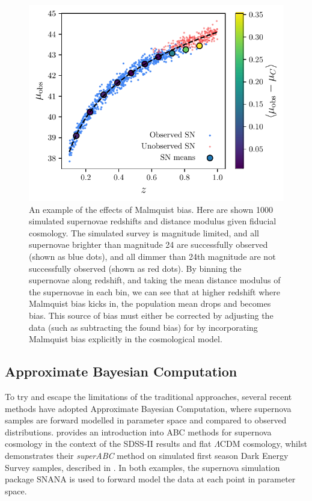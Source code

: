 \documentclass[a4paper,fleqn,usenatbib]{mnras}
\begin{document}
\begin{figure}
	\begin{center}
		\includegraphics[width=\columnwidth]{malmquist.pdf}
	\end{center}
	\caption{An example of the effects of Malmquist bias. Here are shown 1000 simulated supernovae redshifts and distance modulus given fiducial cosmology. The simulated survey is magnitude limited, and all supernovae brighter than magnitude 24 are successfully observed (shown as blue dots), and all dimmer than 24th magnitude are not successfully observed (shown as red dots). By binning the supernovae along redshift, and taking the mean distance modulus of the supernovae in each bin, we can see that at higher redshift where Malmquist bias kicks in, the population mean drops and becomes bias. This source of bias must either be corrected by adjusting the data (such as subtracting the found bias) for by incorporating Malmquist bias explicitly in the cosmological model.}
	\label{fig:malmquist}
\end{figure}


\subsection{Approximate Bayesian Computation}

To try and escape the limitations of the traditional approaches, several recent methods have adopted Approximate Bayesian Computation, where supernova samples are forward modelled in parameter space and compared to observed distributions. \citet{Weyant2013} provides an introduction into ABC methods for supernova cosmology in the context of the SDSS-II results \citep{Sako2014} and flat $\Lambda$CDM cosmology, whilst \citet{Jennings2016} demonstrates their \textit{superABC} method on simulated first season Dark Energy Survey samples, described in \citet{Kessler2015}. In both examples, the supernova simulation package SNANA \citep{Kessler2009a} is used to forward model the data at each point in parameter space.
\end{document}
